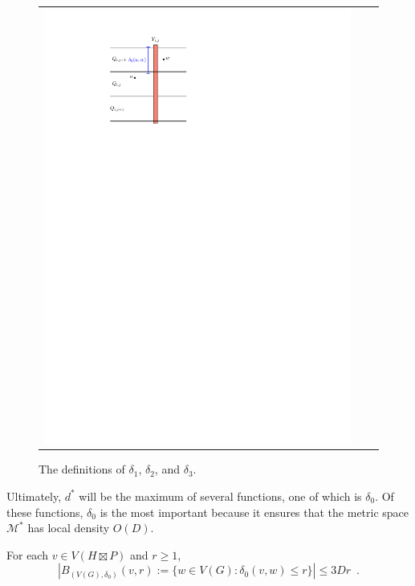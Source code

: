 \documentclass{patmorin}
\renewcommand{\ge}{\geqslant}
\renewcommand{\le}{\leqslant}
\begin{document}
\begin{figure}
\begin{tabular}{ccc}
    \includegraphics[page=3,scale=0.85]{figs/new_metric}
    \end{tabular}
    \caption{The definitions of $\delta_1$, $\delta_2$, and $\delta_3$.}
    \label{d_star}
\end{figure}

Ultimately, $d^*$ will be the maximum of several functions, one of which is $\delta_0$.  Of these functions, $\delta_0$ is the most important because it ensures that the metric space $\mathcal{M}^*$ has local density $O(D)$.

\begin{lem}\label{delta_density}
  For each $v\in V(H\boxtimes P)$ and $r\ge 1$,
  \[
    |B_{(V(G),\delta_0)}(v,r):=\{w\in V(G):\delta_0(v,w)\le r\}| \le 3Dr \enspace .
  \]
\end{lem}
\end{document}
